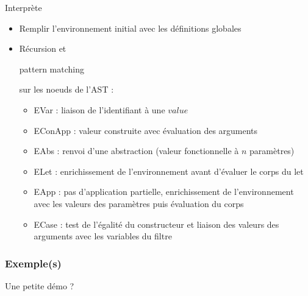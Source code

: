 \begin{frame}{Interprète}
  \begin{itemize}
  \item Remplir l'environnement initial avec les définitions globales
  \item Récursion et \begin{it}pattern matching\end{it} sur les
    noeuds de l'AST :
    \begin{itemize}
    \item EVar : liaison de l'identifiant à une $value$
    \item EConApp : valeur construite avec évaluation des arguments
    \item EAbs : renvoi d'une abstraction (valeur fonctionnelle à $n$
      paramètres)
    \item ELet : enrichissement de l'environnement avant d'évaluer le
      corps du let
    \item EApp : pas d'application partielle, enrichissement de
      l'environnement avec les valeurs des paramètres puis évaluation
      du corps
    \item ECase : test de l'égalité du constructeur et liaison des
      valeurs des arguments avec les variables du filtre
    \end{itemize}
  \end{itemize}
\end{frame}

\begin{frame}
  \frametitle{Exemple(s)}
  Une petite démo ?
\end{frame}

    
    
